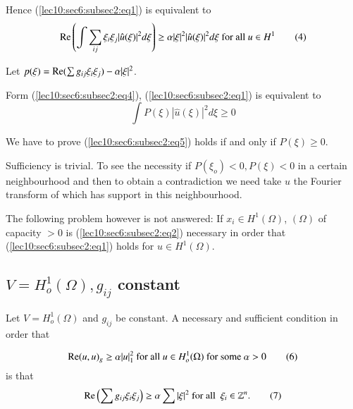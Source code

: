  Hence (\ref{lec10:sec6:subsec2:eq1}) is equivalent to
 \begin{equation*}
   \operatorname{Re} \left(\int \sum _{ij} \xi_i \xi_j |\hat{u} (\xi)|^2 d
   \xi\right) \geq \alpha 
   |\xi|^2 |\hat{u} (\xi)|^2 d \xi \text{ for all } u \in H^1
   \tag{4}\label{lec10:sec6:subsec2:eq4} 
 \end{equation*} 
 
Let \qquad $p (\xi) = \operatorname{Re}  (\sum g_{ij} \xi_i \xi_j) - \alpha |\xi|^2$.

Form (\ref{lec10:sec6:subsec2:eq4}), (\ref{lec10:sec6:subsec2:eq1}) is equivalent to
\begin{equation}
  \int P(\xi ) |\hat{u}(\xi)|^2 d \xi \geq 0 \tag{5}\label{lec10:sec6:subsec2:eq5}
\end{equation}

We have to prove (\ref{lec10:sec6:subsec2:eq5}) holds if and only if $P (\xi) \geq 0$.

Sufficiency is trivial. To see the necessity if $P (\xi_o)< 0, P (\xi)
< 0$ in a certain neighbourhood and then to obtain a contradiction we\pageoriginale
need take $u$ the Fourier transform of which has support in this
neighbourhood. 

The following problem however is not answered: If $x_i \in H^1
(\Omega)$, $(\Omega)$ of capacity $> 0$ is (\ref{lec10:sec6:subsec2:eq2}) necessary in order
that (\ref{lec10:sec6:subsec2:eq1}) holds for $u \in H^1 (\Omega)$. 
\medskip

\subsection{\texorpdfstring{$V = H^1_o (\Omega), g_{ij}$}{VH1} constant}\label{lec10:sec6:subsec3}

\begin{theorem}\label{lec10:sec6:subsec3:thm6.3}%
  Let $V = H^1 _o (\Omega)$ and $g_{ij}$ be constant. A necessary and
  sufficient condition in order that 
\end{theorem}

\begin{equation*}
  \operatorname{Re}  (u,u)_g \geq \alpha |u|^2_1~\text{for all}~ u \in H^1_o
  (\Omega) ~\text{for some}~ \alpha > 0 \tag{6}\label{lec10:sec6:subsec3:eq6} 
\end{equation*}
is that
\begin{equation*}
\operatorname{Re}  \left(\sum g_{ij} \xi_i \xi_j\right)\geq \alpha \sum |\xi|^2 ~\text{for all
}~  \xi_i \in \mathbb{Z}^n. \tag{7}\label{lec10:sec6:subsec3:eq7} 
\end{equation*}

